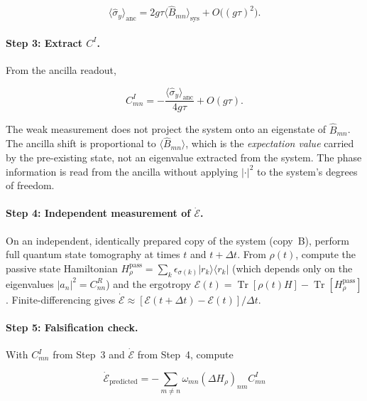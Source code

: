 \documentclass[aps,pra,preprint,groupedaddress,amsmath,amssymb,floatfix]{revtex4-2}
\begin{document}
\begin{equation}
\langle \hat{\sigma}_y \rangle_{\text{anc}} = 2g\tau \langle \hat{B}_{mn} \rangle_{\text{sys}} + O\bigl((g\tau)^2\bigr).
\label{eq:sigma_y}
\end{equation}

\paragraph{Step 3: Extract $C^I$.}
From the ancilla readout,

\begin{equation}
C^I_{mn} = -\frac{\langle \hat{\sigma}_y \rangle_{\text{anc}}}{4g\tau} + O(g\tau).
\label{eq:CI_extract}
\end{equation}

The weak measurement does not project the system onto an eigenstate of $\hat{B}_{mn}$. The ancilla shift is proportional to $\langle \hat{B}_{mn} \rangle$, which is the \textit{expectation value} carried by the pre-existing state, not an eigenvalue extracted from the system. The phase information is read from the ancilla without applying $|\cdot|^2$ to the system's degrees of freedom.

\paragraph{Step 4: Independent measurement of $\dot{\mathcal{E}}$.}
On an independent, identically prepared copy of the system (copy~B), perform full quantum state tomography at times $t$ and $t + \Delta t$. From $\rho(t)$, compute the passive state Hamiltonian $H_\rho^{\text{pass}} = \sum_k \epsilon_{\sigma(k)} |r_k\rangle\langle r_k|$ (which depends only on the eigenvalues $|a_n|^2 = C^R_{nn}$) and the ergotropy $\mathcal{E}(t) = \operatorname{Tr}[\rho(t)H] - \operatorname{Tr}[H_\rho^{\text{pass}}]$. Finite-differencing gives $\dot{\mathcal{E}} \approx [\mathcal{E}(t+\Delta t) - \mathcal{E}(t)]/\Delta t$.

\paragraph{Step 5: Falsification check.}
With $C^I_{mn}$ from Step~3 and $\dot{\mathcal{E}}$ from Step~4, compute

\begin{equation}
\dot{\mathcal{E}}_{\text{predicted}} = -\sum_{m\neq n} \omega_{mn} (\Delta H_\rho)_{nm} C^I_{mn}
\label{eq:predicted}
\end{equation}
\end{document}
